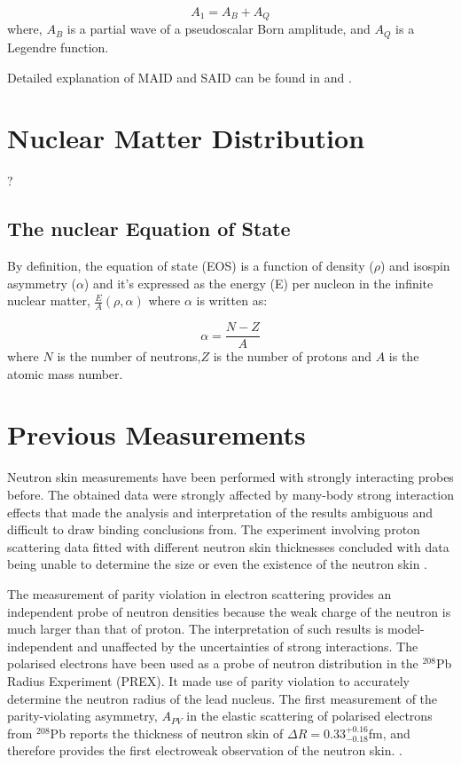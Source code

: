 \begin{equation}
A_{1}=A_{B}+A_{Q}
\end{equation}
where, $A_{B}$ is a partial wave of a pseudoscalar Born amplitude, and $A_{Q}$ is a Legendre function.

\indent Detailed explanation of MAID and SAID can be found in \cite{maid} and \cite{said, arndt}.

\section{Nuclear Matter Distribution}

\indent ?

\subsection{The nuclear Equation of State}

\indent By definition, the equation of state (EOS) is a function of density ($\rho$) and isospin asymmetry ($\alpha$) and it's expressed as the energy (E) per nucleon in the infinite nuclear matter, $\frac{E}{A} (\rho,\alpha)$ where $\alpha$ is written as:

\begin{equation}
\alpha=\frac{N-Z}{A}
\end{equation}
where $N$ is the number of neutrons,$Z$ is the number of protons and $A$ is the atomic mass number.



\section{Previous Measurements}

\indent Neutron skin measurements have been performed with strongly interacting probes before. The obtained data were strongly affected by many-body strong interaction effects that made the analysis and interpretation of the results ambiguous and difficult to draw binding conclusions from. The experiment involving proton scattering data fitted with different neutron skin thicknesses concluded with data being unable to determine the size or even the existence of the neutron skin \cite{piek}.

\indent The measurement of parity violation in electron scattering provides an independent probe of neutron densities because the weak charge of the neutron is much larger than that of proton. The interpretation of such results is model-independent and unaffected by the uncertainties of strong interactions. The polarised electrons have been used as a probe of neutron distribution in the $^{208}$Pb Radius Experiment (PREX). It made use of parity violation to accurately determine the neutron radius of the lead nucleus. The first measurement of the parity-violating asymmetry, $A_{PV}$ in the elastic scattering of polarised electrons from $^{208}$Pb reports the thickness of neutron skin of $\Delta R = 0.33_{-0.18}^{+0.16}$fm, and therefore provides the first electroweak observation of the neutron skin. \cite{prex}.

